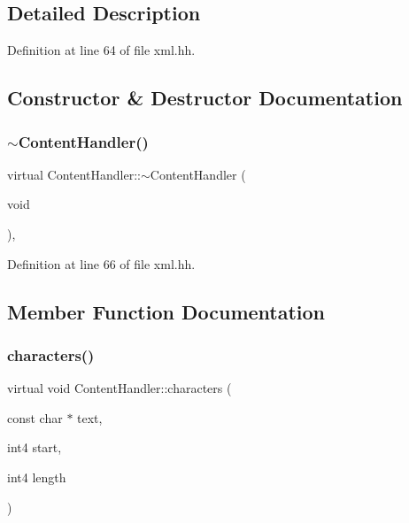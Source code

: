 \subsection{Detailed Description}


Definition at line 64 of file xml.\+hh.



\subsection{Constructor \& Destructor Documentation}
\mbox{\label{class_content_handler_aa338e67b4d0fb4da36de5d9a2eb290c0}} 
\subsubsection{\texorpdfstring{$\sim$ContentHandler()}{~ContentHandler()}}
{\footnotesize\ttfamily virtual Content\+Handler\+::$\sim$\+Content\+Handler (\begin{DoxyParamCaption}\item[{void}]{ }\end{DoxyParamCaption})\hspace{0.3cm}{\ttfamily [inline]}, {\ttfamily [virtual]}}



Definition at line 66 of file xml.\+hh.



\subsection{Member Function Documentation}
\mbox{\label{class_content_handler_a546761acfc0e8cc5fe72bbceaccf9f9e}} 
\subsubsection{\texorpdfstring{characters()}{characters()}}
{\footnotesize\ttfamily virtual void Content\+Handler\+::characters (\begin{DoxyParamCaption}\item[{const char $\ast$}]{text,  }\item[{int4}]{start,  }\item[{int4}]{length }\end{DoxyParamCaption})\hspace{0.3cm}{\ttfamily [pure virtual]}}



